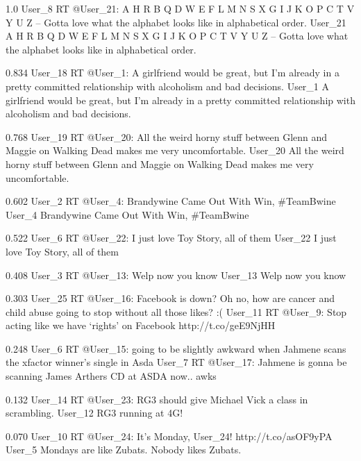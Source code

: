 {1.0}
{\joinNameTweet
{User\_8}
{RT @User\_21: A H R B Q D W E F L M N S X G I J K O P C T V Y U Z -- Gotta love what the alphabet looks like in alphabetical order.}}
{\joinNameTweet
{User\_21}
{A H R B Q D W E F L M N S X G I J K O P C T V Y U Z -- Gotta love what the alphabet looks like in alphabetical order.}}

{0.834}
{\joinNameTweet
{User\_18}
{RT @User\_1: A girlfriend would be great, but I'm already in a pretty committed relationship with alcoholism and bad decisions.}}
{\joinNameTweet
{User\_1}
{A girlfriend would be great, but I'm already in a pretty committed relationship with alcoholism and bad decisions.}}

{0.768}
{\joinNameTweet
{User\_19}
{RT @User\_20: All the weird horny stuff between Glenn and Maggie on Walking Dead makes me very uncomfortable.}}
{\joinNameTweet
{User\_20}
{All the weird horny stuff between Glenn and Maggie on Walking Dead makes me very uncomfortable.}}

{0.602}
{\joinNameTweet
{User\_2}
{RT @User\_4: Brandywine Came Out With Win, \#TeamBwine}}
{\joinNameTweet
{User\_4}
{Brandywine Came Out With Win, \#TeamBwine}}

{0.522}
{\joinNameTweet
{User\_6}
{RT @User\_22: I just love Toy Story, all of them}}
{\joinNameTweet
{User\_22}
{I just love Toy Story, all of them}}

{0.408}
{\joinNameTweet
{User\_3}
{RT @User\_13: Welp now you know}}
{\joinNameTweet
{User\_13}
{Welp now you know}}

{0.303}
{\joinNameTweet
{User\_25}
{RT @User\_16: Facebook is down? Oh no, how are cancer and child abuse going to stop without all those likes? :(}}
{\joinNameTweet
{User\_11}
{RT @User\_9: Stop acting like we have ‘rights' on Facebook http://t.co/geE9NjHH}}

{0.248}
{\joinNameTweet
{User\_6}
{RT @User\_15: going to be slightly awkward when Jahmene scans the xfactor winner's single in Asda}}
{\joinNameTweet
{User\_7}
{RT @User\_17: Jahmene is gonna be scanning James Arthers CD at ASDA now.. awks}}

{0.132}
{\joinNameTweet
{User\_14}
{RT @User\_23: RG3 should give Michael Vick a class in scrambling.}}
{\joinNameTweet
{User\_12}
{RG3 running at 4G!}}

{0.070}
{\joinNameTweet
{User\_10}
{RT @User\_24: It's Monday, User\_24! http://t.co/asOF9yPA}}
{\joinNameTweet
{User\_5}
{Mondays are like Zubats. Nobody likes Zubats.}}
